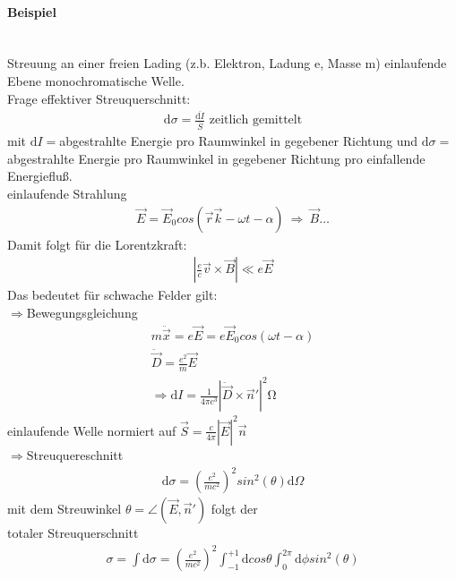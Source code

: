 \documentclass[a4paper]{article}
\newcommand{\intd}{\int\!\mathrm{d}}
\begin{document}
\paragraph{Beispiel}\\
Streuung an einer freien Lading (z.b. Elektron, Ladung e, Masse m) einlaufende
Ebene monochromatische Welle.\\
Frage effektiver Streuquerschnitt:
\begin{align}
\mathrm{d}\sigma=\frac{\overline{\mathrm{d}I}}{\overline{S}} \text{  zeitlich
gemittelt}
\end{align}
mit $\mathrm{d}I=$abgestrahlte Energie pro Raumwinkel in gegebener Richtung und
$\mathrm{d}\sigma=$abgestrahlte Energie pro Raumwinkel in gegebener Richtung pro
einfallende Energiefluß.\\
einlaufende Strahlung
\begin{align}
\vec{E}=\vec{E}_0 cos(\vec{r}\vec{k}-\omega t -\alpha)\ \Rightarrow\ 
\vec{B}\ldots
\end{align}
Damit folgt für die Lorentzkraft:
\begin{align}
\left| \frac{e}{c}\vec{v}\times\vec{B}\right|\ll e\vec{E}
\end{align}
Das bedeutet für schwache Felder gilt:\\
$\Rightarrow$Bewegungsgleichung
\begin{align}
m\ddot{\vec{x}}=e\vec{E}=e\vec{E}_0 cos(\omega t -\alpha)\\
\ddot{\vec{D}}=\frac{e^2}{m}\vec{E}\\
\Rightarrow \mathrm{d}I=\frac{1}{4\pi c^3}\left|
\ddot{\vec{D}}\times\vec{n}' \right|^2 \mathrm{\Omega}
\end{align}
einlaufende Welle normiert auf $\vec{S}=\frac{c}{4\pi}|\vec{E}|^2\vec{n}$\\
$\Rightarrow$Streuquereschnitt\\
\begin{align}
\mathrm{d}\sigma = \left(\frac{e^2}{mc^2} \right)^2 sin^2(\theta)
\mathrm{d}\Omega
\end{align}
mit dem Streuwinkel $\theta=\angle(\vec{E},\vec{n}')$ folgt der\\
totaler Streuquerschnitt
\begin{align}
\sigma=\intd\sigma=\left(\frac{e^2}{mc^2} \right)^2\int_{-1}^{+1}
\mathrm{d}cos\theta \int_0^{2\pi}\mathrm{d}\phi sin^2(\theta)
\end{align}
\end{document}
